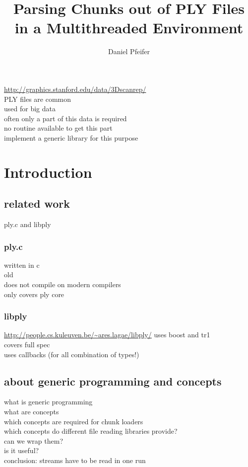 \documentclass{article}
\title{Parsing Chunks out of PLY Files\\in a Multithreaded Environment}
\author{Daniel Pfeifer}
\begin{document}
\maketitle

\abstract
%
\url{http://graphics.stanford.edu/data/3Dscanrep/}\\
PLY files are common\\
used for big data\\
often only a part of this data is required\\
no routine available to get this part\\
implement a generic library for this purpose\\
%

\section{Introduction}
\subsection{related work}
%
ply.c and libply

\subsubsection{ply.c}
written in c\\
old\\
does not compile on modern compilers\\
only covers ply core\\

\subsubsection{libply}
\url{http://people.cs.kuleuven.be/~ares.lagae/libply/}
uses boost and tr1\\
covers full spec\\
uses callbacks (for all combination of types!)\\

\subsection{about generic programming and concepts}
%
what is generic programming\\
what are concepts\\
which concepts are required for chunk loaders\\
which concepts do different file reading libraries provide?\\
can we wrap them?\\
is it useful?\\
conclusion: streams have to be read in one run\\
\end{document}
